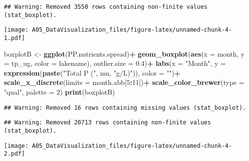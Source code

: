 \documentclass[
]{article}
\newenvironment{Shaded}{\begin{snugshade}}{\end{snugshade}}
\newcommand{\DataTypeTok}[1]{\textcolor[rgb]{0.13,0.29,0.53}{#1}}
\newcommand{\DecValTok}[1]{\textcolor[rgb]{0.00,0.00,0.81}{#1}}
\newcommand{\FloatTok}[1]{\textcolor[rgb]{0.00,0.00,0.81}{#1}}
\newcommand{\KeywordTok}[1]{\textcolor[rgb]{0.13,0.29,0.53}{\textbf{#1}}}
\newcommand{\NormalTok}[1]{#1}
\newcommand{\OperatorTok}[1]{\textcolor[rgb]{0.81,0.36,0.00}{\textbf{#1}}}
\newcommand{\StringTok}[1]{\textcolor[rgb]{0.31,0.60,0.02}{#1}}
\begin{document}
\begin{verbatim}
## Warning: Removed 3550 rows containing non-finite values (stat_boxplot).
\end{verbatim}

\texttt{[image: A05\_DataVisualization\_files/figure-latex/unnamed-chunk-4-1.pdf]}

\begin{Shaded}
\begin{Highlighting}[]
\NormalTok{boxplotB <-}\StringTok{ }\KeywordTok{ggplot}\NormalTok{(PP.nutrients.spread)}\OperatorTok{+}
\StringTok{  }\KeywordTok{geom_boxplot}\NormalTok{(}\KeywordTok{aes}\NormalTok{(}\DataTypeTok{x =}\NormalTok{ month, }\DataTypeTok{y =}\NormalTok{ tp_ug, }\DataTypeTok{color =}\NormalTok{ lakename), }\DataTypeTok{outlier.size =} \FloatTok{0.4}\NormalTok{)}\OperatorTok{+}
\StringTok{  }\KeywordTok{labs}\NormalTok{(}\DataTypeTok{x =} \StringTok{"Month"}\NormalTok{, }\DataTypeTok{y =} \KeywordTok{expression}\NormalTok{(}\KeywordTok{paste}\NormalTok{(}\StringTok{"Total P ("}\NormalTok{, mu, }\StringTok{"g/L)"}\NormalTok{)),}
       \DataTypeTok{color =} \StringTok{""}\NormalTok{)}\OperatorTok{+}
\StringTok{  }\KeywordTok{scale_x_discrete}\NormalTok{(}\DataTypeTok{limits =}\NormalTok{ month.abb[}\DecValTok{5}\OperatorTok{:}\DecValTok{11}\NormalTok{])}\OperatorTok{+}
\StringTok{  }\KeywordTok{scale_color_brewer}\NormalTok{(}\DataTypeTok{type =} \StringTok{"qual"}\NormalTok{, }\DataTypeTok{palette =} \DecValTok{2}\NormalTok{)}
\KeywordTok{print}\NormalTok{(boxplotB)}
\end{Highlighting}
\end{Shaded}

\begin{verbatim}
## Warning: Removed 16 rows containing missing values (stat_boxplot).
\end{verbatim}

\begin{verbatim}
## Warning: Removed 20713 rows containing non-finite values (stat_boxplot).
\end{verbatim}

\texttt{[image: A05\_DataVisualization\_files/figure-latex/unnamed-chunk-4-2.pdf]}
\end{document}
